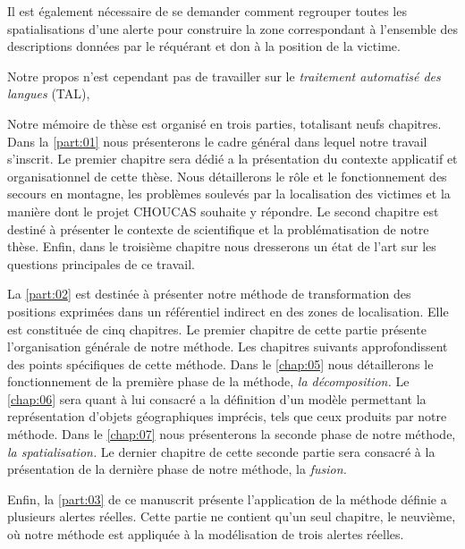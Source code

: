 

Il est également nécessaire de se demander comment regrouper toutes
les spatialisations d'une alerte pour construire la zone correspondant
à l'ensemble des descriptions données par le réquérant et don à la
position de la victime.





Notre propos n'est cependant pas de travailler sur le \emph{traitement
  automatisé des langues} (TAL), 



Notre mémoire de thèse est organisé en trois parties, totalisant neufs
chapitres. Dans la \autoref{part:01} nous présenterons le cadre
général dans lequel notre travail s'inscrit. Le premier chapitre sera
dédié a la présentation du contexte applicatif et organisationnel de
cette thèse. Nous détaillerons le rôle et le fonctionnement des
secours en montagne, les problèmes soulevés par la localisation des
victimes et la manière dont le projet CHOUCAS souhaite y répondre. Le
second chapitre est destiné à présenter le contexte de scientifique et
la problématisation de notre thèse. Enfin, dans le troisième chapitre
nous dresserons un état de l'art sur les questions principales de ce
travail.

La \autoref{part:02} est destinée à présenter notre méthode de
transformation des positions exprimées dans un référentiel indirect en
des zones de localisation. Elle est constituée de cinq chapitres. Le
premier chapitre de cette partie présente l’organisation générale de
notre méthode. Les chapitres suivants approfondissent des points
spécifiques de cette méthode. Dans le \autoref{chap:05} nous
détaillerons le fonctionnement de la première phase de la méthode,
\emph{la décomposition.} Le \autoref{chap:06} sera quant à lui
consacré a la définition d'un modèle permettant la représentation
d'objets géographiques imprécis, tels que ceux produits par notre
méthode. Dans le \autoref{chap:07} nous présenterons la seconde phase
de notre méthode, \emph{la spatialisation.} Le dernier chapitre de
cette seconde partie sera consacré à la présentation de la dernière
phase de notre méthode, la \emph{fusion.}

Enfin, la \autoref{part:03} de ce manuscrit présente l’application de
la méthode définie a plusieurs alertes réelles. Cette partie ne
contient qu'un seul chapitre, le neuvième, où notre méthode est
appliquée à la modélisation de trois alertes réelles.


